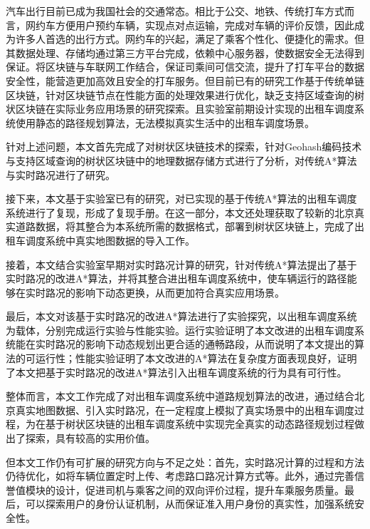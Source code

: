 %
%
%
%
%
%

\begin{conclusion}
汽车出行目前已成为我国社会的交通常态。相比于公交、地铁、传统打车方式而言，网约车方便用户预约车辆，实现点对点运输，完成对车辆的评价反馈，因此成为许多人首选的出行方式。网约车的兴起，满足了乘客个性化、便捷化的需求。但其数据处理、存储均通过第三方平台完成，依赖中心服务器，使数据安全无法得到保证。将区块链与车联网工作结合，保证司乘间可信交流，提升了打车平台的数据安全性，能营造更加高效且安全的打车服务。但目前已有的研究工作基于传统单链区块链，针对区块链节点在性能方面的处理效果进行优化，缺乏支持区域查询的树状区块链在实际业务应用场景的研究探索。且实验室前期设计实现的出租车调度系统使用静态的路径规划算法，无法模拟真实生活中的出租车调度场景。

针对上述问题，本文首先完成了对树状区块链技术的探索，针对Geohash编码技术与支持区域查询的树状区块链中的地理数据存储方式进行了分析，对传统A*算法与实时路况进行了研究。

接下来，本文基于实验室已有的研究，对已实现的基于传统A*算法的出租车调度系统进行了复现，形成了复现手册。在这一部分，本文还处理获取了较新的北京真实道路数据，将其整合为本系统所需的数据格式，部署到树状区块链上，完成了出租车调度系统中真实地图数据的导入工作。

接着，本文结合实验室早期对实时路况计算的研究，针对传统A*算法提出了基于实时路况的改进A*算法，并将其整合进出租车调度系统中，使车辆运行的路径能够在实时路况的影响下动态更换，从而更加符合真实应用场景。

最后，本文对该基于实时路况的改进A*算法进行了实验探究，以出租车调度系统为载体，分别完成运行实验与性能实验。运行实验证明了本文改进的出租车调度系统能在实时路况的影响下动态规划出更合适的通畅路段，从而说明了本文提出的算法的可运行性；性能实验证明了本文改进的A*算法在复杂度方面表现良好，证明了本文把基于实时路况的改进A*算法引入出租车调度系统的行为具有可行性。

整体而言，本文工作完成了对出租车调度系统中道路规划算法的改进，通过结合北京真实地图数据、引入实时路况，在一定程度上模拟了真实场景中的出租车调度过程，为在基于树状区块链的出租车调度系统中实现完全真实的动态路径规划过程做出了探索，具有较高的实用价值。

但本文工作仍有可扩展的研究方向与不足之处：首先，实时路况计算的过程和方法仍待优化，如将车辆位置定时上传、考虑路口路况计算方式等。此外，通过完善信誉值模块的设计，促进司机与乘客之间的双向评价过程，提升车乘服务质量。最后，可以探索用户的身份认证机制，从而保证准入用户身份的真实性，加强系统安全性。

\end{conclusion}

